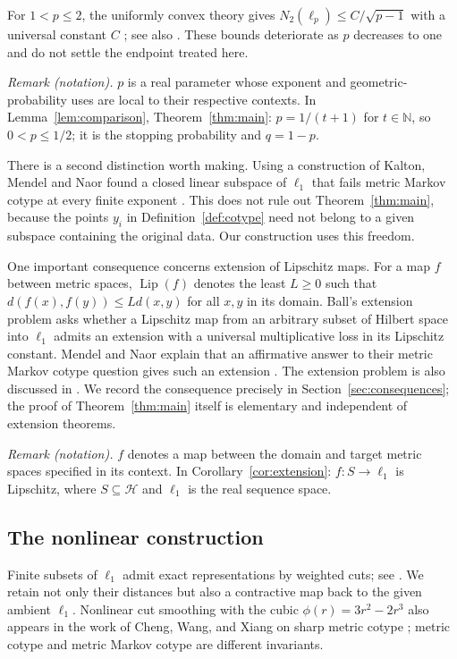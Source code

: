 \documentclass[11pt]{article}
\theoremstyle{definition}
\theoremstyle{remark}
\numberwithin{equation}{section}
\newcommand{\N}{\mathbb N}
\DeclareMathOperator{\Lip}{Lip}
\begin{document}
For $1<p\leq2$, the uniformly convex theory gives
$N_2(\ell_p)\leq C/\sqrt{p-1}$ with a universal constant $C$
\cite{Ball92}; see also \cite[Section~1.1]{MendelNaor13}.
These bounds deteriorate as $p$ decreases to one and do not settle
the endpoint treated here.

\noindent\textit{Remark (notation).} $p$ is a real parameter whose exponent and geometric-probability uses are local to their respective contexts. In Lemma~\ref{lem:comparison}, Theorem~\ref{thm:main}: $p=1/(t+1)$ for $t\in\N$, so $0<p\leq1/2$; it is the stopping probability and $q=1-p$.


There is a second distinction worth making. Using a construction
of Kalton, Mendel and Naor found a closed linear subspace of
$\ell_1$ that fails metric Markov cotype at every finite exponent
\cite[Theorem~1.14]{MendelNaor13}.
This does not rule out Theorem~\ref{thm:main}, because the points
$y_i$ in Definition~\ref{def:cotype} need not belong to a given
subspace containing the original data. Our construction uses
this freedom.

One important consequence concerns extension of Lipschitz maps.
For a map $f$ between metric spaces, $\Lip(f)$ denotes the least
$L\geq0$ such that $d(f(x),f(y))\leq Ld(x,y)$ for all $x,y$ in its
domain. Ball's extension problem asks whether a Lipschitz map from
an arbitrary subset of Hilbert space into $\ell_1$ admits an
extension with a universal multiplicative loss in its Lipschitz
constant. Mendel and Naor explain that an affirmative answer to
their metric Markov cotype question gives such an extension
\cite[Corollary~1.13 and the discussion after Question~1.15]{MendelNaor13}.
The extension problem is also discussed in
\cite[Section~1]{NaorYoung22}. We record the consequence precisely
in Section~\ref{sec:consequences}; the proof of
Theorem~\ref{thm:main} itself is elementary and independent of
extension theorems.

\noindent\textit{Remark (notation).} $f$ denotes a map between the domain and target metric spaces specified in its context. In Corollary~\ref{cor:extension}: $f:S\to\ell_1$ is Lipschitz, where $S\subseteq\mathcal H$ and $\ell_1$ is the real sequence space.


\subsection*{The nonlinear construction}
Finite subsets of $\ell_1$ admit exact representations by weighted
cuts; see \cite{DezaLaurent97}. We retain not only their distances
but also a contractive map back to the given ambient $\ell_1$.
Nonlinear cut smoothing with the cubic $\phi(r)=3r^2-2r^3$
also appears in the work of Cheng, Wang, and Xiang on sharp
metric cotype \cite{ChengWangXiang26}; metric cotype and metric
Markov cotype are different invariants.
\end{document}
